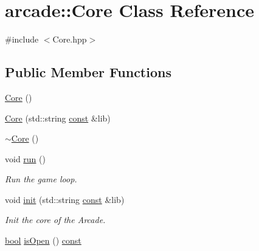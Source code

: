 \hypertarget{classarcade_1_1_core}{\section{arcade\-:\-:Core Class Reference}
\label{classarcade_1_1_core}
}


{\ttfamily \#include $<$Core.\-hpp$>$}

\subsection*{Public Member Functions}
\begin{DoxyCompactItemize}
\item 
\hyperlink{classarcade_1_1_core_a4df26a87245b8cb158e80573d2f16a0f}{Core} ()
\item 
\hyperlink{classarcade_1_1_core_a28ae7bcd5b0ed147adac37b930483e0e}{Core} (std\-::string \hyperlink{term__entry_8h_a57bd63ce7f9a353488880e3de6692d5a}{const} \&lib)
\item 
\hyperlink{classarcade_1_1_core_a4a80f4851276173b3055fc41268d3b3d}{$\sim$\-Core} ()
\item 
void \hyperlink{classarcade_1_1_core_aeef47f92a01ce88c5d7937424dadb03e}{run} ()
\begin{DoxyCompactList}\small\item\em Run the game loop. \end{DoxyCompactList}\item 
void \hyperlink{classarcade_1_1_core_a374038e2012b107fa2f148c6376a9e14}{init} (std\-::string \hyperlink{term__entry_8h_a57bd63ce7f9a353488880e3de6692d5a}{const} \&lib)
\begin{DoxyCompactList}\small\item\em Init the core of the Arcade. \end{DoxyCompactList}\item 
\hyperlink{term__entry_8h_a002004ba5d663f149f6c38064926abac}{bool} \hyperlink{classarcade_1_1_core_a3498bfc05d09decb57363a9fc035074e}{is\-Open} () \hyperlink{term__entry_8h_a57bd63ce7f9a353488880e3de6692d5a}{const} 
\end{DoxyCompactItemize}


